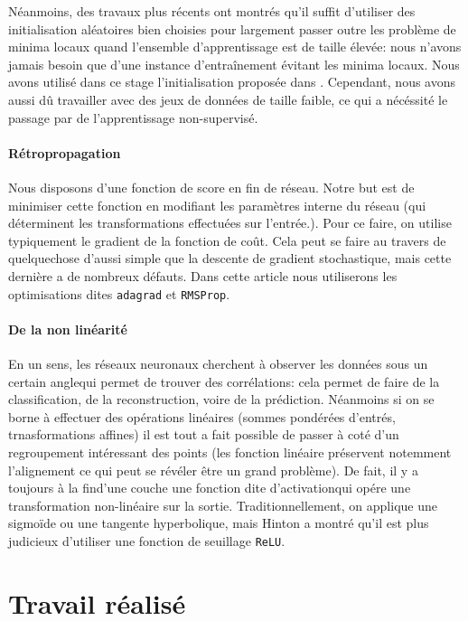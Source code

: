 \documentclass[a4paper,11pt]{article}
\begin{document}
Néanmoins, des travaux plus récents ont montrés qu'il suffit d'utiliser des
initialisation aléatoires bien choisies pour largement passer outre les problème
de minima locaux quand l'ensemble d'apprentissage est de taille élevée: nous n'avons jamais besoin que d'une instance d'entraînement
évitant les minima locaux. Nous avons utilisé dans ce stage l'initialisation
proposée dans . Cependant, nous avons aussi dû travailler avec des jeux de
données de taille faible, ce qui a nécéssité le passage par de l'apprentissage
non-supervisé.

\paragraph{Rétropropagation}

Nous disposons d'une fonction de score en fin de réseau. Notre but est de
minimiser cette fonction en modifiant les paramètres interne du réseau (qui
déterminent les transformations effectuées sur l'entrée.). Pour ce faire, on
utilise typiquement le gradient de la fonction de coût. Cela peut se faire au
travers de quelquechose d'aussi simple que la descente de gradient stochastique, mais cette
dernière a de nombreux défauts. Dans cette article nous utiliserons les
optimisations dites \texttt{adagrad} et \texttt{RMSProp}.

\paragraph{De la non linéarité}

En un sens, les réseaux neuronaux cherchent à observer les données \og sous un
certain angle\fg qui permet de trouver des corrélations: cela permet de faire de
la classification, de la reconstruction, voire de la prédiction. Néanmoins si on
se borne à effectuer des opérations linéaires (sommes pondérées
d'entrés, trnasformations affines) il est tout a fait possible de passer à coté
d'un regroupement intéressant des points (les fonction linéaire préservent
notemment l'alignement ce qui peut se révéler être un grand problème). De fait,
il y a toujours \og à la fin\fg d'une couche une fonction dite \og
d'activation\fg qui opére une transformation non-linéaire sur la sortie.
Traditionnellement, on applique une sigmoïde ou une tangente hyperbolique, mais
Hinton a montré qu'il est plus judicieux d'utiliser une fonction de seuillage \texttt{ReLU}.

\section{Travail réalisé}
\end{document}
